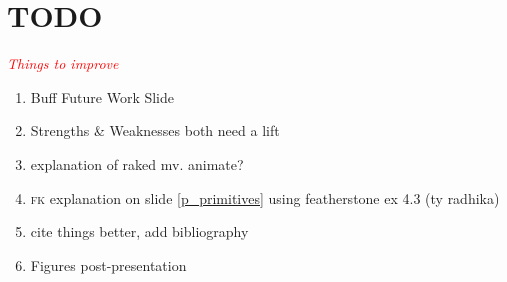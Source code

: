 \documentclass{beamer}
\newcommand{\todo}[1]{\textit{\textcolor{red}{#1}}}
\begin{document}
\section {TODO}

\begin{frame}{\todo{Things to improve}}
\begin{enumerate}
\item Buff Future Work Slide
\item Strengths \& Weaknesses both need a lift
\item explanation of raked mv. animate?
\item \textsc{fk} explanation on slide \ref{p_primitives} using featherstone ex 4.3 (ty radhika)
\item cite things better, add bibliography
\item Figures post-presentation
\end{enumerate}
\end{frame}
\end{document}
